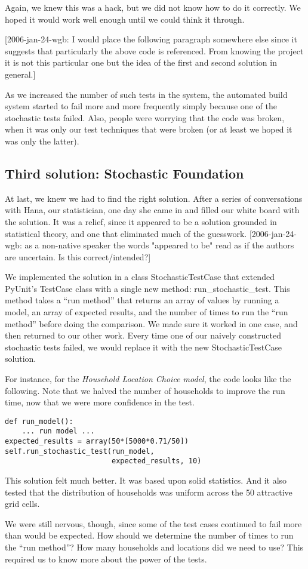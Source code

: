 Again, we knew this was a hack, but we did not know how to do it correctly.  We 
hoped it would work well enough until we could think it through.

[2006-jan-24-wgb: I would place the following paragraph somewhere else since it
suggests that particularly the above code is referenced. From knowing the project it is
not this particular one but the idea of the first and second solution in general.]

As we increased the number of such tests in the system, the automated build 
system started to fail more and more frequently simply because one of the 
stochastic tests failed.  Also, people were worrying that the code was broken, 
when it was only our test techniques that were broken (or at least we hoped it 
was only the latter).

\subsection{Third solution: Stochastic Foundation}

At last, we knew we had to find the right solution.  After a series of 
conversations with Hana, our statistician, one day she came in and filled our 
white board with the solution.  It was a relief, since it appeared to be a 
solution grounded in statistical theory, and one that eliminated much of the 
guesswork.  
[2006-jan-24-wgb: as a non-native speaker the words "appeared to be" 
read as if the authors are uncertain. Is this correct/intended?]

We implemented the solution in a class {\sf StochasticTestCase} that extended 
PyUnit's {\sf TestCase} class with a single new method: 
{\sf run\_stochastic\_test}.  
This method takes a ``run method'' that returns an 
array of values by running a model, an array of expected results, and the 
number of times to run the ``run method'' before doing the comparison.  We made 
sure it worked in one case, and then returned to our other work.  Every time 
one of our naively constructed stochastic tests failed, we would replace it 
with the new {\sf StochasticTestCase} solution.  

For instance, for the \emph{Household Location Choice model}, the code looks like the 
following.  Note that we halved the number of households to improve the run 
time, now that we were more confidence in the test.

\begin{verbatim}
def run_model():
    ... run model ...
expected_results = array(50*[5000*0.71/50])
self.run_stochastic_test(run_model, 
                         expected_results, 10)
\end{verbatim}

This solution felt much better.  It was based upon solid statistics.  And it 
also tested that the distribution of households was uniform across the 50 
attractive grid cells.

We were still nervous, though, since some of the test cases continued to fail 
more than would be expected.  How should we determine the number of times to 
run the ``run method''?  How many households and locations did we need to use? 
This required us to know more about the power of the tests.

